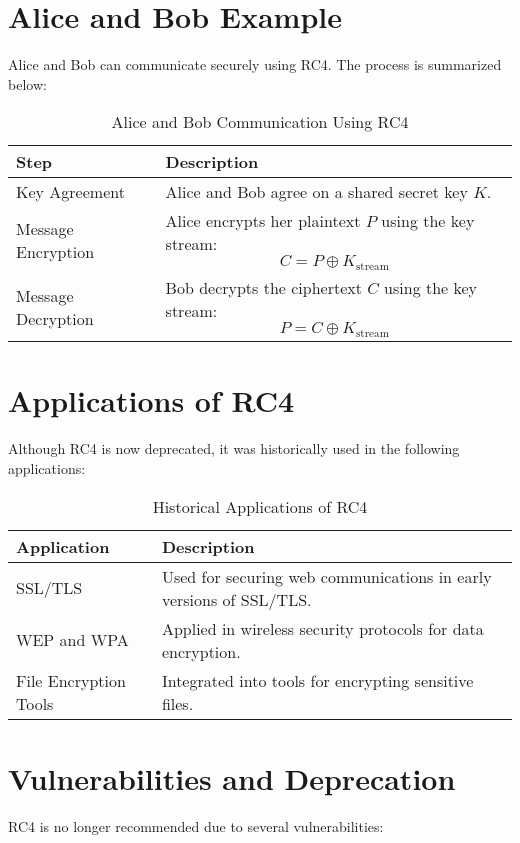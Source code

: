\documentclass[11pt]{article}
\begin{document}
\section{Alice and Bob Example}
Alice and Bob can communicate securely using RC4. The process is summarized below:

\begin{table}[h!]
\centering
\begin{tabular}{|p{4cm}|p{8cm}|}
\hline
\textbf{Step}          & \textbf{Description} \\ \hline
Key Agreement          & Alice and Bob agree on a shared secret key \( K \). \\ \hline
Message Encryption     & Alice encrypts her plaintext \( P \) using the key stream:
                        \[
                        C = P \oplus K_{\text{stream}}
                        \] \\ \hline
Message Decryption     & Bob decrypts the ciphertext \( C \) using the key stream:
                        \[
                        P = C \oplus K_{\text{stream}}
                        \] \\ \hline
\end{tabular}
\caption{Alice and Bob Communication Using RC4}
\end{table}

\section{Applications of RC4}
Although RC4 is now deprecated, it was historically used in the following applications:

\begin{table}[h!]
\centering
\begin{tabular}{|p{4cm}|p{8cm}|}
\hline
\textbf{Application}   & \textbf{Description} \\ \hline
SSL/TLS                & Used for securing web communications in early versions of SSL/TLS. \\ \hline
WEP and WPA            & Applied in wireless security protocols for data encryption. \\ \hline
File Encryption Tools  & Integrated into tools for encrypting sensitive files. \\ \hline
\end{tabular}
\caption{Historical Applications of RC4}
\end{table}

\section{Vulnerabilities and Deprecation}
RC4 is no longer recommended due to several vulnerabilities:
\end{document}
